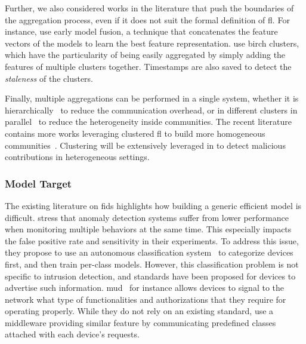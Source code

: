 Further, we also considered works in the literature that push the boundaries of the aggregation process, even if it does not suit the formal definition of \gls{fl}.
For instance, \textcite{rathore_BlockSecIoTNetBlockchainbaseddecentralized_2019} use early model fusion, a technique that concatenates the feature vectors of the models to learn the best feature representation.
\textcite{pahl_AllEyesYou_2018} use \gls{birch} clusters, which have the particularity of being easily aggregated by simply adding the features of multiple clusters together.
Timestamps are also saved to detect the \emph{staleness} of the clusters.

Finally, multiple aggregations can be performed in a single system, whether it is hierarchically~\cite{liu_BlockchainFederatedLearning_2021} to reduce the communication overhead, or in different clusters in parallel~\cite{sun_IntrusionDetectionSegmented_2020,sun_AdaptiveIntrusionDetection_2021} to reduce the heterogeneity inside communities.
The recent literature contains more works leveraging clustered \gls{fl} to build more homogeneous communities~\cite{cai_ClusterbasedFederatedLearning_2022,shan_CFLIDSEffectiveClustered_2024}.
Clustering will be extensively leveraged in  to detect malicious contributions in heterogeneous settings.


\subsubsection{Model Target\label{sec:sota.quali.target}}

The existing literature on \gls{fids} highlights how building a generic efficient model is difficult.
\textcite{nguyen_DIoTFederatedSelflearning_2019} stress that anomaly detection systems suffer from lower performance when monitoring multiple behaviors at the same time.
This especially impacts the false positive rate and sensitivity in their experiments.
To address this issue, they propose to use an autonomous classification system~\cite{marchal_AuDIAutonomousIoT_2019} to categorize devices first, and then train per-class models.
However, this classification problem is not specific to intrusion detection, and standards have been proposed for devices to advertise such information.
\Gls{mud}~\cite{MUD_rfc} for instance allows devices to signal to the network what type of functionalities and authorizations that they require for operating properly.
While they do not rely on an existing standard, \textcite{pahl_AllEyesYou_2018} use a middleware providing similar feature by communicating predefined classes attached with each device's requests.

